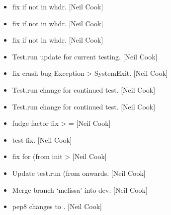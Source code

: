 \documentclass[a4paper,10pt,english]{report}
\begin{document}
\label{\detokenize{misc/changelog:id251}}\begin{itemize}
\item {} 
 \sphinxhyphen{} fix if  not in whdr. {[}Neil Cook{]}

\item {} 
 \sphinxhyphen{} fix if  not in whdr. {[}Neil Cook{]}

\item {} 
 \sphinxhyphen{} fix if  not in whdr. {[}Neil Cook{]}

\item {} 
Test.run \sphinxhyphen{} update for current testing. {[}Neil Cook{]}

\item {} 
 \sphinxhyphen{} fix crash bug Exception \textendash{}\textgreater{} SystemExit.
{[}Neil Cook{]}

\item {} 
Test.run \sphinxhyphen{} change for continued test. {[}Neil Cook{]}

\item {} 
Test.run \sphinxhyphen{} change for continued test. {[}Neil Cook{]}

\item {} 
 \sphinxhyphen{} fudge factor fix \textendash{}\textgreater{}  =
 {[}Neil Cook{]}

\item {} 
 \sphinxhyphen{} test fix. {[}Neil Cook{]}

\item {} 
 \sphinxhyphen{} fix for  (from init \textendash{}\textgreater{} 
{[}Neil Cook{]}

\item {} 
Update test.run \sphinxhyphen{}  (from  onwards. {[}Neil Cook{]}

\item {} 
Merge branch ‘melissa’ into dev. {[}Neil Cook{]}

\item {} 
 \sphinxhyphen{} pep8 changes to . {[}Neil Cook{]}


\end{itemize}
\end{document}
